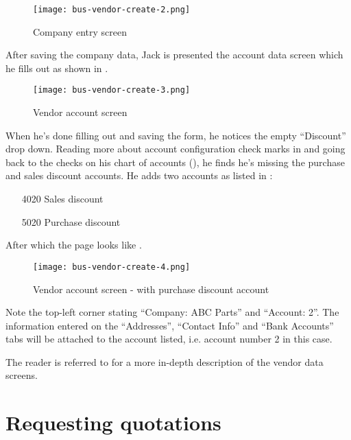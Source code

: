 \begin{figure}[h]
\centering
\texttt{[image: bus-vendor-create-2.png]}
\caption{Company entry screen}
\label{fig:vendor-create-1}
\end{figure}

After saving the company data, Jack is presented the account data screen which he fills out
as shown in .

\begin{figure}[h]
\centering
\texttt{[image: bus-vendor-create-3.png]}
\caption{Vendor account screen}
\label{fig:vendor-create-2}
\end{figure}

When he's done filling out and saving the form,
he notices the empty ``Discount'' drop down. Reading more about account configuration
check marks in  and going back to the checks on his
chart of accounts (), he finds he's missing the purchase and
sales discount accounts. He adds two accounts as listed in :

\begin{itemize}
\item [4020] Sales discount
\item [5020] Purchase discount
\end{itemize}

After which the page looks like .

\begin{figure}[h]
\centering
\texttt{[image: bus-vendor-create-4.png]}
\caption{Vendor account screen - with purchase discount account}
\label{fig:vendor-create-3}
\end{figure}

Note the top-left corner stating ``Company: ABC Parts'' and ``Account: 2''. The information
entered on the ``Addresses'', ``Contact Info'' and ``Bank Accounts'' tabs will be attached
to the account listed, i.e. account number 2 in this case.

The reader is referred to  for a more in-depth
description of the vendor data screens.

\section{Requesting quotations}
\label{sec-stock-request-quotation}


